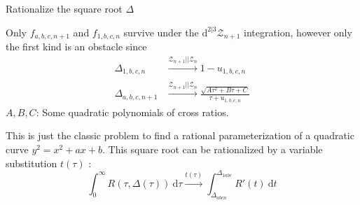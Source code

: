 \documentclass[10pt]{beamer}
\newcommand{\dif}{\mathrm{d}}
\begin{document}
\begin{frame}{Rationalize the square root $\Delta$}

Only $f_{a,b,c,n+1}$ and $f_{1,b,c,n}$ survive under the $\dif^{2\vert3}\mathcal{Z}_{n+1}$ integration, \newline
however only the first kind is an obstacle
since
\begin{align*}
\Delta_{1,b,c,n} &\xrightarrow[]{\mathcal{Z}_{n+1}\vert\vert \mathcal{Z}_{n}} 1-u_{1,b,c,n}\\
\Delta_{a,b,c,n+1}&\xrightarrow[]{\mathcal{Z}_{n+1}\vert\vert \mathcal{Z}_{n}}\frac{\sqrt{A \tau^{2}+B\tau+C}}{\tau+u_{1,b,c,n}}
\end{align*}
$A,B,C$: Some quadratic polynomials of cross ratios. 

This is just the classic problem to find a rational parameterization of a quadratic curve $y^{2}=x^{2}+ax+b$. \newline 
This square root can be rationalized by a variable substitution $t(\tau)$ :
\[
  \int_{0}^{\infty} R(\tau,\Delta(\tau))\:\dif\tau \xrightarrow[]{t(\tau)}\int_{\Delta_{abcn}}^{\Delta_{1abc}} R'(t)\:\dif t
  \]


\end{frame}
\end{document}
